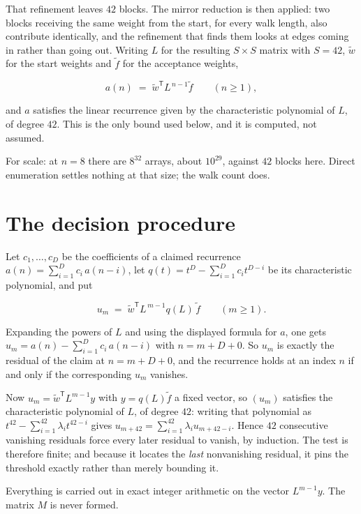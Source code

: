 \documentclass[11pt]{article}
\theoremstyle{definition}
\begin{document}
That refinement leaves $42$ blocks. The mirror reduction is then applied: two blocks receiving the same weight from the start, for every walk length, also contribute identically, and the refinement that finds them looks at edges coming in rather than going out. Writing $L$ for the resulting $S \times S$ matrix with $S = 42$, $\tilde w$ for the start weights and $\tilde f$ for the acceptance weights,

\[a(n) \;=\; \tilde w^{\mathsf T} L^{\,n-1} \tilde f \qquad (n \ge 1),\]

and $a$ satisfies the linear recurrence given by the characteristic polynomial of $L$, of degree $42$. This is the only bound used below, and it is computed, not assumed.

For scale: at $n = 8$ there are $8^{32}$ arrays, about $10^{29}$, against $42$ blocks here. Direct enumeration settles nothing at that size; the walk count does.

\section{The decision procedure}

Let $c_1,\dots,c_D$ be the coefficients of a claimed recurrence $a(n) = \sum_{i=1}^{D} c_i\,a(n-i)$, let $q(t) = t^{D} - \sum_{i=1}^{D} c_i t^{D-i}$ be its characteristic polynomial, and put

\[u_m \;=\; \tilde w^{\mathsf T} L^{\,m-1} q(L)\,\tilde f \qquad (m \ge 1).\]

Expanding the powers of $L$ and using the displayed formula for $a$, one gets $u_m = a(n) - \sum_{i=1}^{D} c_i\,a(n-i)$ with $n = m + D + 0$. So $u_m$ is exactly the residual of the claim at $n = m + D + 0$, and the recurrence holds at an index $n$ if and only if the corresponding $u_m$ vanishes.

Now $u_m = \tilde w^{\mathsf T} L^{m-1} y$ with $y = q(L)\tilde f$ a fixed vector, so $(u_m)$ satisfies the characteristic polynomial of $L$, of degree $42$: writing that polynomial as $t^{42} - \sum_{i=1}^{42} \lambda_i t^{42-i}$ gives $u_{m+42} = \sum_{i=1}^{42} \lambda_i u_{m+42-i}$. Hence $42$ consecutive vanishing residuals force every later residual to vanish, by induction. The test is therefore finite; and because it locates the {\itshape last} nonvanishing residual, it pins the threshold exactly rather than merely bounding it.

Everything is carried out in exact integer arithmetic on the vector $L^{m-1}y$. The matrix $M$ is never formed.
\end{document}
